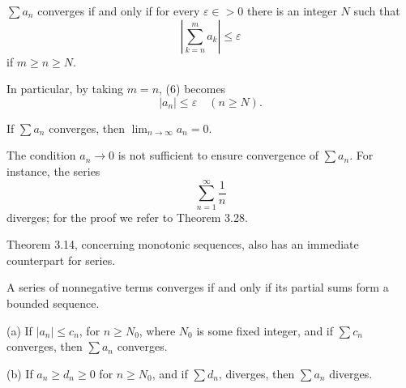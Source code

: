 \begin{thm}
    \label{thm:3.22}
    $\sum a_n$  converges if and only if for every $\varepsilon \in > 0$ there is an integer $N$ such that
    \begin{equation}
        \left|
            \sum_{k=n}^{m} a_k 
        \right| \leq \varepsilon
    \end{equation}
    if $m \geq n \geq N$. 
\end{thm}

In particular, by taking $m = n$, (6) becomes
\begin{equation*}
    |a_n| \leq \varepsilon \quad (n \geq N).
\end{equation*}

\begin{thm}
    \label{thm:3.23}
    If $\sum a_n$ converges, then $\lim_{n \rightarrow \infty} a_n = 0$. 
\end{thm}

The condition $a_n \rightarrow 0$ is not sufficient to ensure convergence of $\sum a_n$. For instance, the series
\begin{equation*}
    \sum_{n=1}^{\infty}\frac{1}{n}
\end{equation*}
diverges; for the proof we refer to Theorem 3.28.

Theorem 3.14, concerning monotonic sequences, also has an immediate
counterpart for series.
\begin{thm}
    \label{thm:3.24}
    A series of nonnegative terms converges if and only if its partial sums form a bounded sequence.
\end{thm}

\begin{thm}
    \label{thm:3.25}
    (a) If $|a_n| \leq c_n$, for $n \geq N_0$, where $N_0$ is some fixed integer, and if $\sum c_n$ converges, then $\sum a_n$ converges.

    (b) If $a_n \geq d_n \geq 0$ for $n \geq N_0$, and if $\sum d_n$, diverges, then $\sum a_n$ diverges.
\end{thm}

